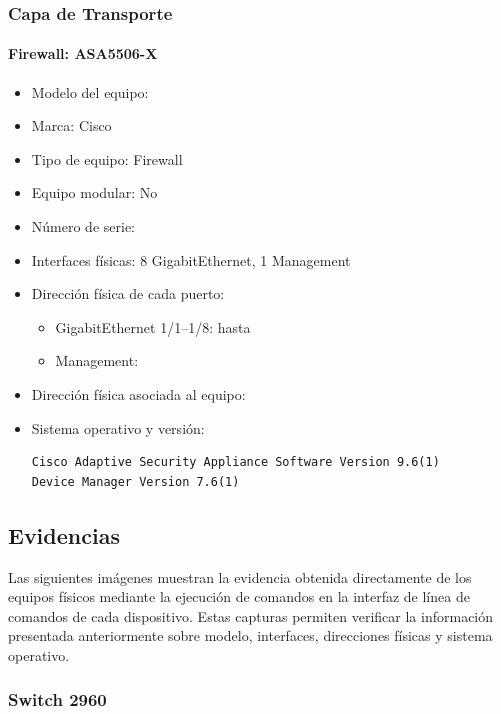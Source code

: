 \subsubsection*{Capa de Transporte}

\paragraph{Firewall: ASA5506-X}
\begin{itemize}
  \item Modelo del equipo: 
  \item Marca: Cisco
  \item Tipo de equipo: Firewall
  \item Equipo modular: No
  \item Número de serie: 
  \item Interfaces físicas: 8 GigabitEthernet, 1 Management
  \item Dirección física de cada puerto:
  \begin{itemize}
    \item GigabitEthernet 1/1–1/8:  hasta 
    \item Management: 
  \end{itemize}
  \item Dirección física asociada al equipo:
  \item Sistema operativo y versión:
\begin{verbatim}
Cisco Adaptive Security Appliance Software Version 9.6(1)
Device Manager Version 7.6(1)
\end{verbatim}
\end{itemize}

\subsection{Evidencias}

Las siguientes imágenes muestran la evidencia obtenida directamente de los
equipos físicos mediante la ejecución de comandos en la interfaz de línea de
comandos de cada dispositivo. Estas capturas permiten verificar la información
presentada anteriormente sobre modelo, interfaces, direcciones físicas y
sistema operativo.

\subsubsection*{Switch 2960}

